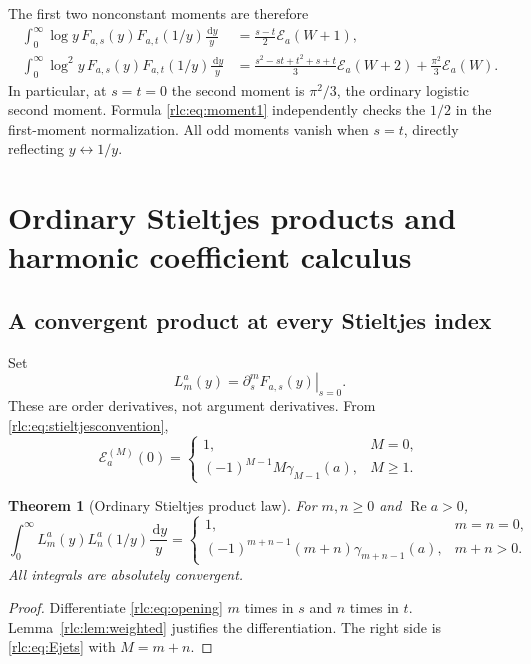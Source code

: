 \documentclass[11pt,a4paper]{article}
\numberwithin{equation}{section}
\newtheorem{theorem}{Theorem}[section]
\theoremstyle{definition}\newtheorem{definition}[theorem]{Definition}
\theoremstyle{remark}\newtheorem{remark}[theorem]{Remark}
\DeclareMathOperator{\Rea}{Re}
\newcommand{\dd}{\,\mathrm d}
\newcommand{\E}{\mathcal E}
\begin{document}
The first two nonconstant moments are therefore
\begin{align}
 \int_0^\infty\log y\,F_{a,s}(y)F_{a,t}(1/y)\frac{\dd y}{y}
 &=\frac{s-t}{2}\E_a(W+1),\label{rlc:eq:moment1}\\
 \int_0^\infty\log^2 y\,F_{a,s}(y)F_{a,t}(1/y)\frac{\dd y}{y}
 &=\frac{s^2-st+t^2+s+t}{3}\E_a(W+2)
      +\frac{\pi^2}{3}\E_a(W).
 \label{rlc:eq:moment2}
\end{align}
In particular, at $s=t=0$ the second moment is $\pi^2/3$, the ordinary
logistic second moment. Formula \eqref{rlc:eq:moment1} independently
checks the $1/2$ in the first-moment normalization. All odd moments
vanish when $s=t$, directly reflecting $y\leftrightarrow1/y$.



\section{Ordinary Stieltjes products and harmonic coefficient calculus}
\label{rlc:sec:stieltjes}

\subsection{A convergent product at every Stieltjes index}
Set
\begin{equation}\label{rlc:eq:Ljets}
 L_m^a(y)=\left.\partial_s^mF_{a,s}(y)\right|_{s=0}.
\end{equation}
These are order derivatives, not argument derivatives. From
\eqref{rlc:eq:stieltjesconvention},
\begin{equation}\label{rlc:eq:Ejets}
 \E_a^{(M)}(0)=
 \begin{cases}
 1,&M=0,\\
 (-1)^{M-1}M\gamma_{M-1}(a),&M\ge1.
 \end{cases}
\end{equation}

\begin{theorem}[Ordinary Stieltjes product law]
\label{rlc:thm:stieltjes}
For $m,n\ge0$ and $\Rea a>0$,
\begin{equation}\label{rlc:eq:stieltjespair}
 \boxed{\displaystyle
 \int_0^\infty L_m^a(y)L_n^a(1/y)\frac{\dd y}{y}
 =\begin{cases}
 1,&m=n=0,\\
 (-1)^{m+n-1}(m+n)\gamma_{m+n-1}(a),&m+n>0.
 \end{cases}}
\end{equation}
All integrals are absolutely convergent.
\end{theorem}
\begin{proof}
Differentiate \eqref{rlc:eq:opening} $m$ times in $s$ and $n$ times
in $t$. Lemma~\ref{rlc:lem:weighted} justifies the differentiation.
The right side is \eqref{rlc:eq:Ejets} with $M=m+n$.
\end{proof}
\end{document}
